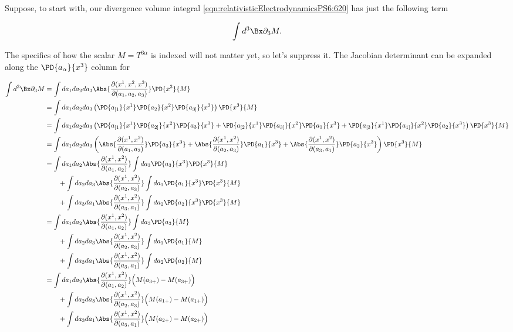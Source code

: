 Suppose, to start with, our divergence volume integral \ref{eqn:relativisticElectrodynamicsPS6:620} has just the following term

\begin{equation}\label{eqn:relativisticElectrodynamicsPS6:520}
\int d^3 \Bx \partial_3 M.
\end{equation}

The specifics of how the scalar $M = T^{3 \alpha}$ is indexed will not matter yet, so let's suppress it.  The Jacobian determinant can be expanded along the $\PD{a_\alpha}{x^3}$ column for

\begin{align*}
\int d^3 \Bx \partial_3 M
&=
\int da_1 da_2 da_3
\Abs{ \frac{\partial(x^1, x^2, x^3)}{\partial (a_1, a_2, a_3)}} 
\PD{x^3}{M} \\
&=
\int da_1 da_2 da_3
\left(
\PD{a_{[1}}{x^1} 
\PD{a_{2}}{x^2} 
\PD{a_{3]}}{x^3} 
\right)
\PD{x^3}{M} \\
&=
\int da_1 da_2 da_3
\left(
\PD{a_{[1}}{x^1} 
\PD{a_{2]}}{x^2} 
\PD{a_{3}}{x^3} 
+
\PD{a_{[2}}{x^1} 
\PD{a_{3]}}{x^2} 
\PD{a_{1}}{x^3} 
+
\PD{a_{[3}}{x^1} 
\PD{a_{1]}}{x^2} 
\PD{a_{2}}{x^3} 
\right)
\PD{x^3}{M} \\
&=
\int da_1 da_2 da_3
\left(
\Abs{ \frac{\partial(x^1, x^2)}{\partial (a_1, a_2)}} 
\PD{a_{3}}{x^3} 
+
\Abs{ \frac{\partial(x^1, x^2)}{\partial (a_2, a_3)}} 
\PD{a_{1}}{x^3} 
+
\Abs{ \frac{\partial(x^1, x^2)}{\partial (a_3, a_1)}} 
\PD{a_{2}}{x^3} 
\right)
\PD{x^3}{M} \\
&=
\int da_1 da_2 \Abs{ \frac{\partial(x^1, x^2)}{\partial (a_1, a_2)}} 
\int da_3 \PD{a_{3}}{x^3} \PD{x^3}{M}  \\
&\qquad +
\int da_2 da_3 \Abs{ \frac{\partial(x^1, x^2)}{\partial (a_2, a_3)}} 
\int da_1 \PD{a_{1}}{x^3} \PD{x^3}{M}  \\
&\qquad +
\int da_3 da_1 \Abs{ \frac{\partial(x^1, x^2)}{\partial (a_3, a_1)}} 
\int da_2 \PD{a_{2}}{x^3} \PD{x^3}{M}  \\
&=
\int da_1 da_2 \Abs{ \frac{\partial(x^1, x^2)}{\partial (a_1, a_2)}} 
\int da_3 \PD{a_{3}}{M}  \\
&\qquad +
\int da_2 da_3 \Abs{ \frac{\partial(x^1, x^2)}{\partial (a_2, a_3)}} 
\int da_1 \PD{a_{1}}{M}  \\
&\qquad +
\int da_3 da_1 \Abs{ \frac{\partial(x^1, x^2)}{\partial (a_3, a_1)}} 
\int da_2 \PD{a_{2}}{M}  \\
&=
\int da_1 da_2 \Abs{ \frac{\partial(x^1, x^2)}{\partial (a_1, a_2)}} 
\Bigl( M(a_{3+}) - M(a_{3+}) \Bigr) \\
&\qquad +
\int da_2 da_3 \Abs{ \frac{\partial(x^1, x^2)}{\partial (a_2, a_3)}} 
\Bigl( M(a_{1+}) - M(a_{1+}) \Bigr) \\
&\qquad +
\int da_3 da_1 \Abs{ \frac{\partial(x^1, x^2)}{\partial (a_3, a_1)}} 
\Bigl( M(a_{2+}) - M(a_{2+}) \Bigr)
\end{align*}

